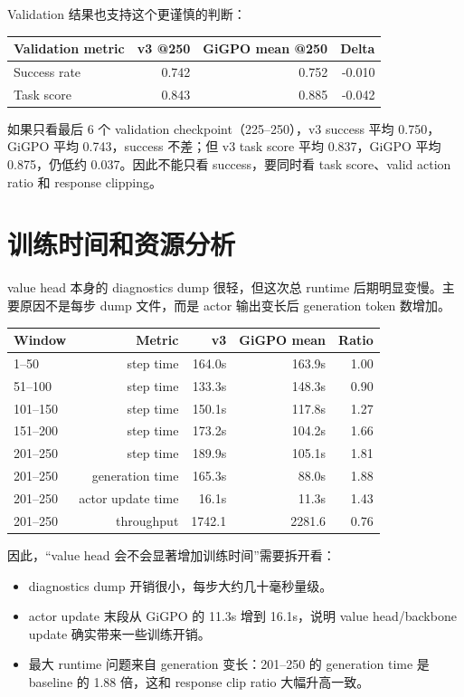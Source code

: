 \documentclass[10pt]{ctexart}
\begin{document}
Validation 结果也支持这个更谨慎的判断：
\begin{center}
\begin{tabular}{lrrr}
\toprule
Validation metric & v3 @250 & GiGPO mean @250 & Delta \\
\midrule
Success rate & 0.742 & 0.752 & -0.010 \\
Task score & 0.843 & 0.885 & -0.042 \\
\bottomrule
\end{tabular}
\end{center}

如果只看最后 6 个 validation checkpoint（225--250），v3 success 平均 0.750，GiGPO 平均 0.743，success 不差；但 v3 task score 平均 0.837，GiGPO 平均 0.875，仍低约 0.037。因此不能只看 success，要同时看 task score、valid action ratio 和 response clipping。

\section{训练时间和资源分析}
value head 本身的 diagnostics dump 很轻，但这次总 runtime 后期明显变慢。主要原因不是每步 dump 文件，而是 actor 输出变长后 generation token 数增加。

\begin{center}
\begin{tabular}{lrrrr}
\toprule
Window & Metric & v3 & GiGPO mean & Ratio \\
\midrule
1--50 & step time & 164.0s & 163.9s & 1.00 \\
51--100 & step time & 133.3s & 148.3s & 0.90 \\
101--150 & step time & 150.1s & 117.8s & 1.27 \\
151--200 & step time & 173.2s & 104.2s & 1.66 \\
201--250 & step time & 189.9s & 105.1s & 1.81 \\
\midrule
201--250 & generation time & 165.3s & 88.0s & 1.88 \\
201--250 & actor update time & 16.1s & 11.3s & 1.43 \\
201--250 & throughput & 1742.1 & 2281.6 & 0.76 \\
\bottomrule
\end{tabular}
\end{center}

因此，“value head 会不会显著增加训练时间”需要拆开看：
\begin{itemize}
  \item diagnostics dump 开销很小，每步大约几十毫秒量级。
  \item actor update 末段从 GiGPO 的 11.3s 增到 16.1s，说明 value head/backbone update 确实带来一些训练开销。
  \item 最大 runtime 问题来自 generation 变长：201--250 的 generation time 是 baseline 的 1.88 倍，这和 response clip ratio 大幅升高一致。
\end{itemize}
\end{document}
